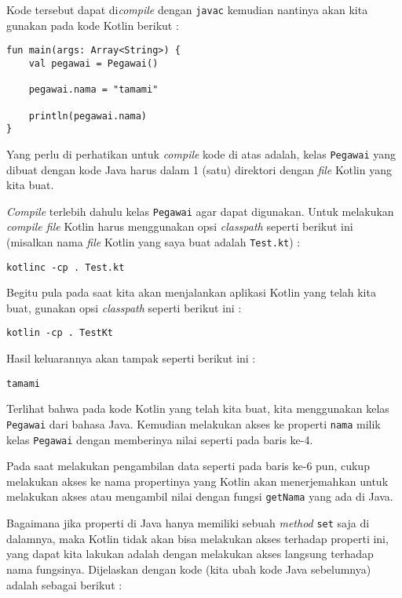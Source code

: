 Kode tersebut dapat di\textit{compile} dengan \texttt{javac} kemudian nantinya akan kita gunakan pada kode Kotlin berikut :

\begin{lstlisting}
fun main(args: Array<String>) {
	val pegawai = Pegawai()
	
	pegawai.nama = "tamami"
	
	println(pegawai.nama)
}
\end{lstlisting}

Yang perlu di perhatikan untuk \textit{compile} kode di atas adalah, kelas \texttt{Pegawai} yang dibuat dengan kode Java harus dalam 1 (satu) direktori dengan \textit{file} Kotlin yang kita buat.

\textit{Compile} terlebih dahulu kelas \texttt{Pegawai} agar dapat digunakan. Untuk melakukan \textit{compile file} Kotlin harus menggunakan opsi \textit{classpath} seperti berikut ini (misalkan nama \textit{file} Kotlin yang saya buat adalah \texttt{Test.kt}) :

\begin{lstlisting}
kotlinc -cp . Test.kt
\end{lstlisting}

Begitu pula pada saat kita akan menjalankan aplikasi Kotlin yang telah kita buat, gunakan opsi \textit{classpath} seperti berikut ini :

\begin{lstlisting}
kotlin -cp . TestKt
\end{lstlisting}

Hasil keluarannya akan tampak seperti berikut ini :

\begin{lstlisting}
tamami
\end{lstlisting}

Terlihat bahwa pada kode Kotlin yang telah kita buat, kita menggunakan kelas \texttt{Pegawai} dari bahasa Java. Kemudian melakukan akses ke properti \texttt{nama} milik kelas \texttt{Pegawai} dengan memberinya nilai seperti pada baris ke-4.

Pada saat melakukan pengambilan data seperti pada baris ke-6 pun, cukup melakukan akses ke nama propertinya yang Kotlin akan menerjemahkan untuk melakukan akses atau mengambil nilai dengan fungsi \texttt{getNama} yang ada di Java.

Bagaimana jika properti di Java hanya memiliki sebuah \textit{method} \texttt{set} saja di dalamnya, maka Kotlin tidak akan bisa melakukan akses terhadap properti ini, yang dapat kita lakukan adalah dengan melakukan akses langsung terhadap nama fungsinya. Dijelaskan dengan kode (kita ubah kode Java sebelumnya) adalah sebagai berikut :

